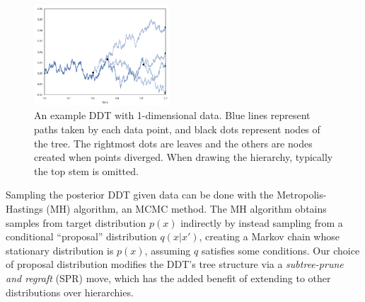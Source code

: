 \begin{figure}[h]
    \centering
    \includegraphics[width=0.45\textwidth]{img/ddt}
    \caption{An example DDT with 1-dimensional data. Blue lines represent paths
    taken by each data point, and black dots represent nodes of the tree.
    The rightmost dots are leaves and the others are nodes
    created when points diverged. When drawing the hierarchy,
    typically the top stem is omitted.}
    \label{fig:ddt}
\end{figure}



Sampling the posterior
DDT given data can be done with the
Metropolis-Hastings (MH) algorithm,
an MCMC method.
The MH algorithm 
obtains samples from target distribution $p(x)$
indirectly by instead sampling
from a conditional ``proposal'' distribution $q(x | x')$,
creating a Markov chain whose stationary
distribution is $p(x)$, assuming $q$ satisfies some conditions.
Our choice of proposal distribution
modifies the DDT's tree structure
via a \emph{subtree-prune and regraft} (SPR) move,
which has the added benefit of extending to
other distributions over hierarchies.

